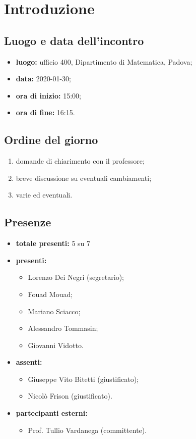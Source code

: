\section*{Introduzione}

\subsection*{Luogo e data dell'incontro}
	\begin{itemize}
		\item \textbf{luogo:} ufficio 400, Dipartimento di Matematica, Padova;
		\item \textbf{data:} 2020-01-30;
		\item \textbf{ora di inizio:} 15:00;
		\item \textbf{ora di fine:} 16:15.
	\end{itemize}

\subsection*{Ordine del giorno}
	\begin{enumerate}
			\item domande di chiarimento con il professore;
  			\item breve discussione su eventuali cambiamenti;
  			\item varie ed eventuali.
	\end{enumerate}

\subsection*{Presenze}
	\begin{itemize}
		\item \textbf{totale presenti:} 5 su 7
		\item \textbf{presenti: }
			\begin{itemize}			
				\item Lorenzo Dei Negri (segretario);
				\item Fouad Mouad;
				\item Mariano Sciacco;
				\item Alessandro Tommasin;
				\item Giovanni Vidotto.
			\end{itemize}
		\item \textbf{assenti: } 
			\begin{itemize}	
				\item Giuseppe Vito Bitetti (giustificato);
				\item Nicolò Frison (giustificato).
			\end{itemize}
		\item \textbf{partecipanti esterni:}
			\begin{itemize}
				\item Prof. Tullio Vardanega (committente).
			\end{itemize}
	\end{itemize}



